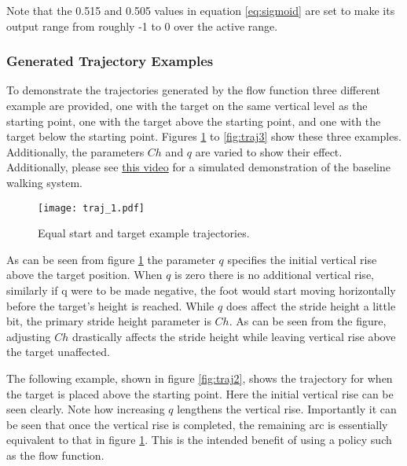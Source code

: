                 \noindent
                Note that the 0.515 and 0.505 values in equation \ref{eq:sigmoid} are set to make its output range from roughly -1 to 0 over the active range.
                
                \newpage
                \subsubsection{Generated Trajectory Examples}
                To demonstrate the trajectories generated by the flow function three different example are provided, one with the target on the same vertical level as the starting point, one with the target above the starting point, and one with the target below the starting point. Figures \ref{fig:traj1} to \ref{fig:traj3} show these three examples. Additionally, the parameters \(Ch\) and \(q\) are varied to show their effect. Additionally, please see \hyperlink{}{this video} for a simulated demonstration of the baseline walking system.
                \begin{figure}[h]
                    \centering
                    \texttt{[image: traj\_1.pdf]}
                    \caption{Equal start and target example trajectories.}
                    \label{fig:traj1}
                \end{figure}

                \noindent
                As can be seen from figure \ref{fig:traj1} the parameter \(q\) specifies the initial vertical rise above the target position. When \(q\) is zero there is no additional vertical rise, similarly if q were to be made negative, the foot would start moving horizontally before the target's height is reached. While \(q\) does affect the stride height a little bit, the primary stride height parameter is \(Ch\). As can be seen from the figure, adjusting \(Ch\) drastically affects the stride height while leaving vertical rise above the target unaffected.

                The following example, shown in figure \ref{fig:traj2}, shows the trajectory for when the target is placed above the starting point. Here the initial vertical rise can be seen clearly. Note how increasing \(q\) lengthens the vertical rise. Importantly it can be seen that once the vertical rise is completed, the remaining arc is essentially equivalent to that in figure \ref{fig:traj1}. This is the intended benefit of using a policy such as the flow function.
                
